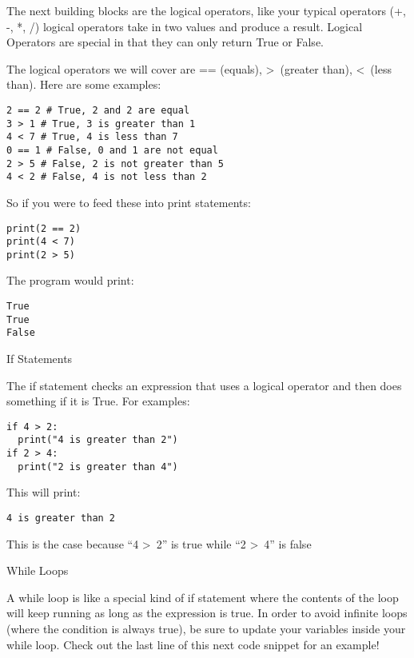 \documentclass[12pt,oneside]{article}
\newcommand{\q}[1]{``#1''}
\newcommand{\subsectitle}[1]{
  \begin{flushleft}{\large#1}\end{flushleft}
}
\begin{document}
The next building blocks are the logical operators, like your typical operators (+, -, *, /) logical operators take in two values and produce a result. Logical Operators are special in that they can only return True or False. 

The logical operators we will cover are == (equals), \textgreater~(greater than), \textless~(less than). Here are some examples:

\begin{lstlisting}
2 == 2 # True, 2 and 2 are equal
3 > 1 # True, 3 is greater than 1
4 < 7 # True, 4 is less than 7
0 == 1 # False, 0 and 1 are not equal
2 > 5 # False, 2 is not greater than 5
4 < 2 # False, 4 is not less than 2
\end{lstlisting}

So if you were to feed these into print statements:

\begin{lstlisting}
print(2 == 2)
print(4 < 7)
print(2 > 5)
\end{lstlisting}

The program would print:

\begin{lstlisting}
True
True
False
\end{lstlisting}


\subsectitle{If Statements}

The if statement checks an expression that uses a logical operator and then does something if it is True. For examples:

\begin{lstlisting}
if 4 > 2:
  print("4 is greater than 2")
if 2 > 4:
  print("2 is greater than 4")
\end{lstlisting}

This will print:

\begin{lstlisting}
4 is greater than 2
\end{lstlisting}

This is the case because \q{4 \textgreater~2} is true while \q{2 \textgreater~4} is false

\subsectitle{While Loops}

A while loop is like a special kind of if statement where the contents of the loop will keep running as long as the expression is true. In order to avoid infinite loops (where the condition is always true), be sure to update your variables inside your while loop. Check out the last line of this next code snippet for an example!
\end{document}
